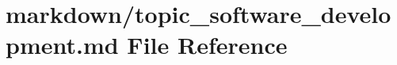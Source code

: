 \hypertarget{topic__software__development_8md}{}\section{markdown/topic\+\_\+software\+\_\+development.md File Reference}
\label{topic__software__development_8md}

